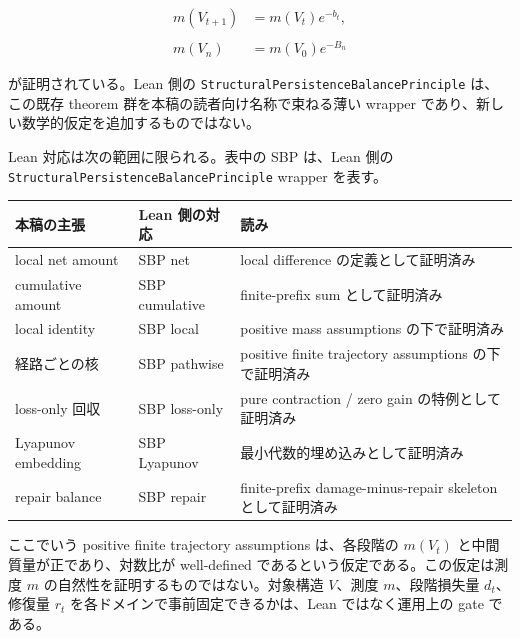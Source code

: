 \documentclass[12pt,a4paper]{article}
\begin{document}
\[
\begin{aligned}
m(V_{t+1})&=m(V_{t})e^{-b_{t}}, \\
\qquad \\
m(V_{n})&=m(V_0)e^{-B_{n}}
\end{aligned}
\]

が証明されている。Lean 側の \texttt{StructuralPersistenceBalancePrinciple} は、この既存 theorem 群を本稿の読者向け名称で束ねる薄い wrapper であり、新しい数学的仮定を追加するものではない。

Lean 対応は次の範囲に限られる。表中の SBP は、Lean 側の \texttt{StructuralPersistenceBalancePrinciple} wrapper を表す。

{\def\LTcaptype{table} %
\begin{longtable}[]{@{}
  >{\raggedright\arraybackslash}p{}
  >{\raggedright\arraybackslash}p{}
  >{\raggedright\arraybackslash}p{}@{}}
\toprule\noalign{}
\begin{minipage}[b]{\linewidth}\raggedright
本稿の主張
\end{minipage} & \begin{minipage}[b]{\linewidth}\raggedright
Lean 側の対応
\end{minipage} & \begin{minipage}[b]{\linewidth}\raggedright
読み
\end{minipage} \\
\midrule\noalign{}
\endhead
\bottomrule\noalign{}
\endlastfoot
local net amount & SBP net & local difference の定義として証明済み \\
cumulative amount & SBP cumulative & finite-prefix sum として証明済み \\
local identity & SBP local & positive mass assumptions の下で証明済み \\
経路ごとの核 & SBP pathwise & positive finite trajectory assumptions の下で証明済み \\
loss-only 回収 & SBP loss-only & pure contraction / zero gain の特例として証明済み \\
Lyapunov embedding & SBP Lyapunov & 最小代数的埋め込みとして証明済み \\
repair balance & SBP repair & finite-prefix damage-minus-repair skeleton として証明済み \\
\end{longtable}
}

ここでいう positive finite trajectory assumptions は、各段階の \(m(V_{t})\) と中間質量が正であり、対数比が well-defined であるという仮定である。この仮定は測度 \(m\) の自然性を証明するものではない。対象構造 \(V\)、測度 \(m\)、段階損失量 \(d_{t}\)、修復量 \(r_{t}\) を各ドメインで事前固定できるかは、Lean ではなく運用上の gate である。
\end{document}
